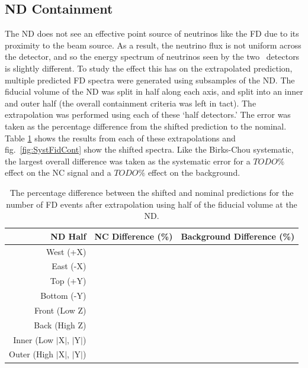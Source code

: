 \subsection{ND Containment}

The ND does not see an effective point source of neutrinos like the FD due to its proximity to the beam source. As a result, the neutrino flux is not uniform across the detector, and so the energy spectrum of neutrinos seen by the two \nova~detectors is slightly different. To study the effect this has on the extrapolated prediction, multiple predicted FD spectra were generated using subsamples of the ND. The fiducial volume of the ND was split in half along each axis, and split into an inner and outer half (the overall containment criteria was left in tact). The extrapolation was performed using each of these `half detectors.' The error was taken as the percentage difference from the shifted prediction to the nominal. Table \ref{tab:SystFidCont} shows the results from each of these extrapolations and fig.~\ref{fig:SystFidCont} show the shifted spectra. Like the Birks-Chou systematic, the largest overall difference was taken as the systematic error for a $TODO\%$ effect on the NC signal and a $TODO\%$ effect on the background.
\begin{table}[h]
  \begin{center}
    \caption[ND Containment Systematic Errors]{The percentage difference between the shifted and nominal predictions for the number of FD events after extrapolation using half of the fiducial volume at the ND.}
    \label{tab:SystFidCont}
    \begin{tabular}{r c c}
      \hline\hline
      ND Half & NC Difference (\%) & Background Difference (\%) \\
      \hline
      West (+X) & & \\
      East (-X) & & \\
      Top (+Y) & & \\
      Bottom (-Y) & & \\
      Front (Low Z) & & \\
      Back (High Z) & & \\
      Inner (Low $\vert$X$\vert$, $\vert$Y$\vert$) & & \\
      Outer (High $\vert$X$\vert$, $\vert$Y$\vert$) & & \\
      \hline
    \end{tabular}
  \end{center}
\end{table}

